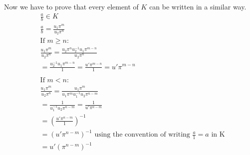 \documentclass[11pt]{article}
\begin{document}
{Now we have to prove that every element of $K$ can be written in a similar way.
\begin{align*}
&\frac{a}{b} \in K\\
&\frac{a}{b} = \frac{u_1\pi ^m}{u_2 \pi ^n}\\
&\text{If $m \geq n$:}\\
&\frac{u_1\pi ^m}{u_2 \pi ^n} = \frac{u_2 \pi ^ n u_2^{-1}u_1\pi ^{m-n}}{u_2 \pi ^n}\\
& = \frac{u_2^{-1}u_1\pi ^{m-n}}{1} = \frac{u'\pi ^{m-n}}{1} = u'\pi ^{m-n}\\
&\\
&\text{If $m < n$:}\\
&\frac{u_1\pi ^m}{u_2 \pi ^n} = \frac{u_1\pi ^m}{u_1 \pi ^m u_1^{-1} u_2 \pi ^{n-m}}\\
&=\frac{1}{u_1^{-1} u_2 \pi ^{n-m}} = \frac{1}{u' \pi ^{n-m}}\\
& = \left( \frac{u' \pi ^{n-m}}{1} \right)^{-1}\\
& = \left( u' \pi ^{n-m} \right)^{-1} \text{ using the convention of writing $\frac{a}{1} = a$ in K}\\
&= u' \left( \pi ^{n-m} \right) ^{-1}
\end{align*}
}
\end{document}
